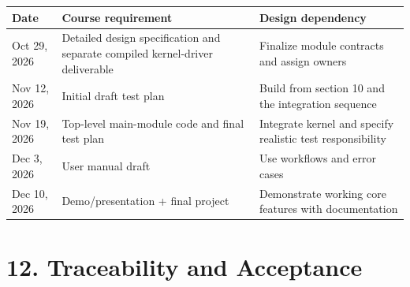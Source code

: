 {\def\LTcaptype{none} %
\begin{longtable}[]{|
  >{\raggedright\arraybackslash}m{}|
  >{\raggedright\arraybackslash}m{}|
  >{\raggedright\arraybackslash}m{}|}
\hline
\begin{minipage}[c]{\linewidth}\raggedright
\textbf{Date}
\end{minipage} & \begin{minipage}[c]{\linewidth}\raggedright
\textbf{Course requirement}
\end{minipage} & \begin{minipage}[c]{\linewidth}\raggedright
\textbf{Design dependency}
\end{minipage} \\
\hline
\endhead

\endlastfoot
Oct 29, 2026 & Detailed design specification and separate compiled kernel-driver deliverable & Finalize module contracts and assign owners \\ \hline
Nov 12, 2026 & Initial draft test plan & Build from section 10 and the integration sequence \\ \hline
Nov 19, 2026 & Top-level main-module code and final test plan & Integrate kernel and specify realistic test responsibility \\ \hline
Dec 3, 2026 & User manual draft & Use workflows and error cases \\ \hline
Dec 10, 2026 & Demo/presentation + final project & Demonstrate working core features with documentation \\ \hline
\end{longtable}
}

\clearpage
\section{12. Traceability and Acceptance}\label{traceability-and-acceptance}

